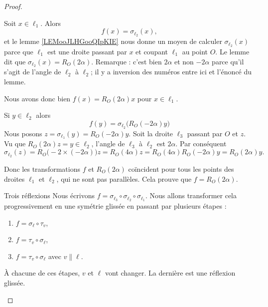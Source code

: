 \begin{proof}
\begin{subproof}
            Soit \( x\in \ell_1\). Alors 
            \begin{equation}
                f(x)=\sigma_{\ell_2}(x),
            \end{equation}
            et le lemme \ref{LEMooJLHGooQIpKIE} nous donne un moyen de calculer \( \sigma_{\ell_2}(x)\) parce que \( \ell_1\) est une droite passant par \( x\) et coupant \( \ell_1\) au point \( O\). Le lemme dit que \( \sigma_{\ell_2}(x)=R_O(2\alpha)\). Remarque : c'est bien \( 2\alpha\) et non \( -2\alpha\) parce qu'il s'agit de l'angle de \( \ell_2\) à \( \ell_2\); il y a inversion des numéros entre ici et l'énoncé du lemme.

            Nous avons donc bien \( f(x)=R_O(2\alpha)x\) pour \( x\in \ell_1\).

            Si \( y\in\ell_2\) alors
            \begin{equation}
                f(y)=\sigma_{\ell_2}\big( R_O(-2\alpha)y \big)
            \end{equation}
            Nous posons \( z=\sigma_{\ell_1}(y)=R_O(-2\alpha)y\). Soit la droite \( \ell_3\) passant par \( O\) et \( z\). Vu que \( R_O(2\alpha)z=y\in \ell_2\), l'angle de \( \ell_3\) à \( \ell_2\) est \( 2\alpha\). Par conséquent 
            \begin{equation}
                \sigma_{\ell_2}(z)=R_O\big( -2\times (-2\alpha) \big)z=R_O(4\alpha)z=R_O(4\alpha)R_O(-2\alpha)y=R_O(2\alpha)y.
            \end{equation}
            
            Donc les transformations \( f\) et \( R_O(2\alpha)\) coïncident pour tous les points des droites \( \ell_1\) et \( \ell_2\), qui ne sont pas parallèles. Cela prouve que \( f=R_{O}(2\alpha)\).

        \item[Trois réflexions]
            Nous écrivons \( f=\sigma_{\ell_3}\circ\sigma_{\ell_2}\circ\sigma_{\ell_1}\). Nous allons transformer cela progressivement en une symétrie glissée en passant par plusieurs étapes :
            \begin{enumerate}
                \item       \label{ITEMooHVYCooPhFMiv}
                    \( f=\sigma_{\ell}\circ\tau_v\),
                \item       \label{ITEMooUKGLooFlCcjt}
                    \( f=\tau_v\circ\sigma_{\ell}\),
                \item       \label{ITEMooWUCWooZSjofe}
                    \( f=\tau_v\circ\sigma_{\ell} \) avec \( v\parallel\ell\).
            \end{enumerate}
            À chacune de ces étapes, \( v\) et \( \ell\) vont changer. La dernière est une réflexion glissée.


\end{subproof}
\end{proof}
